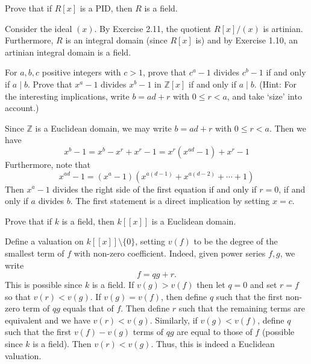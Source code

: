 \documentclass[../../master.tex]{subfiles}
\begin{document}
    \begin{problem}
        Prove that if $R[x]$ is a PID, then $R$ is a field.
    \end{problem}

    \begin{solution}
        Consider the ideal $(x)$. By Exercise 2.11, the quotient $R[x] / (x)$ is
        artinian. Furthermore, $R$ is an integral domain (since $R[x]$ is) and
        by Exercise 1.10, an artinian integral domain is a field.
    \end{solution}

    \begin{problem}
        For $a, b, c$ positive integers with $c > 1$, prove that $c^{a}-1$
        divides $c^{b} - 1$ if and only if $a \mid b$. Prove that $x^{a} - 1$
        divides $x^{b} - 1$ in $\mathbb{Z}[x]$ if and only if $a \mid b$. (Hint:
        For the interesting implications, write $b = ad + r$ with $0 \leq r <
        a$, and take `size' into account.)
    \end{problem}

    \begin{solution}
        Since $\mathbb{Z}$ is a Euclidean domain, we may write $b = ad + r$ with
        $0 \leq r < a$. Then we have 
        \[
            x^{b} - 1 = x^{b} - x^{r} + x^{r} - 1 = x^{r} \left( x^{ad} -
                1\right) + x^{r} - 1
        \] 
        Furthermore, note that
        \[
            x^{ad} - 1 = (x^{a} -1) \left(x^{a(d-1)} + x^{a(d-2)} + \cdots +
                1\right)
        \] 
        Then $x^{a} - 1$ divides the right side of the first equation if and
        only if $r = 0$, if and only if $a$ divides $b$. The first statement is
        a direct implication by setting $x = c$.
    \end{solution}

    \begin{problem}
        Prove that if $k$ is a field, then $k[[x]]$ is a Euclidean domain.
    \end{problem}

    \begin{solution}
        Define a valuation on $k[[x]] \setminus \{0\}$, setting $v(f)$ to be the
        degree of the smallest term of $f$ with non-zero coefficient. Indeed,
        given power series $f, g$, we write
        \[
        f = qg + r.
        \] 
        This is possible since $k$ is a field. If $v(g) > v(f)$ then let $q =
        0$ and set $r = f$ so that $v(r) < v(g)$. If $v(g) = v(f)$, then define
        $q$ such that the first non-zero term of $qg$ equals that of $f$. Then
        define $r$ such that the remaining terms are equivalent and we have 
        $v(r) < v(g)$. Similarly, if $v(g) < v(f)$, define $q$ such that the
        first $v(f) - v(g)$ terms of $qg$ are equal to those of $f$ (possible
        since $k$ is a field). Then $v(r) < v(g)$. Thus, this is indeed a
        Euclidean valuation.
    \end{solution}
\end{document}
